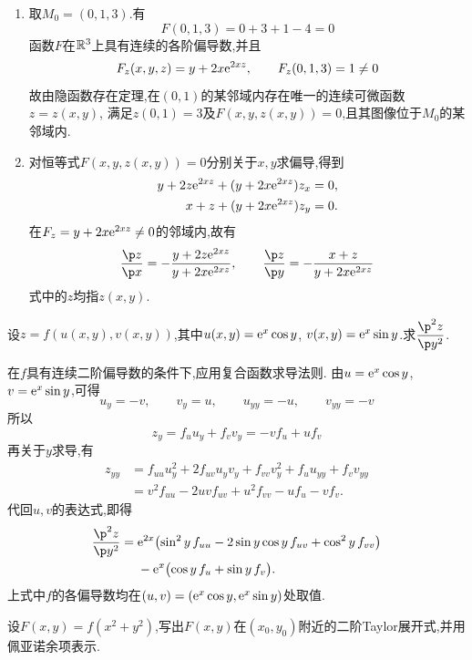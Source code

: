 \documentclass{ctexart}
\begin{document}
\begin{solution}
\begin{enumerate}[label=\tbf{(\alph*)},leftmargin=*]
\item 取$M_0=(0,1,3)$.有
\[F(0,1,3)=0+3+1-4=0\]
函数$F$在$\mathbb{R}^3$上具有连续的各阶偏导数,并且
\[F_z(x,y,z)=y+2x\mathrm{e}^{2xz},\qquad F_z(0,1,3)=1\ne0\]
故由隐函数存在定理,在$(0,1)$的某邻域内存在唯一的连续可微函数$z=z(x,y)$,
满足$z(0,1)=3$及$F(x,y,z(x,y))=0$,且其图像位于$M_0$的某邻域内.
\item 对恒等式$F(x,y,z(x,y))=0$分别关于$x,y$求偏导,得到
\[\begin{aligned}
y+2z\mathrm{e}^{2xz}+(y+2x\mathrm{e}^{2xz})z_x&=0,\\
x+z+(y+2x\mathrm{e}^{2xz})z_y&=0.
\end{aligned}\]
在$F_z=y+2x\mathrm{e}^{2xz}\ne0$的邻域内,故有
\[\dfrac{\p z}{\p x}=-\dfrac{y+2z\e^{2xz}}{y+2x\e^{2xz}},\qquad
\dfrac{\p z}{\p y}=-\dfrac{x+z}{y+2x\e^{2xz}}\]
式中的$z$均指$z(x,y)$.
\end{enumerate}
\end{solution}
\begin{problem}[6.]
设$z=f(u(x,y),v(x,y))$,其中$u(x,y)=\mathrm{e}^x\cos y$, $v(x,y)=\mathrm{e}^x\sin y$.求$\dfrac{\p^2z}{\p y^2}$.
\end{problem}
\begin{solution}
在$f$具有连续二阶偏导数的条件下,应用复合函数求导法则.
由$u=\mathrm{e}^x\cos y$, $v=\mathrm{e}^x\sin y$,可得
\[u_y=-v,\qquad v_y=u,\qquad u_{yy}=-u,\qquad v_{yy}=-v\]
所以
\[z_y=f_u u_y+f_v v_y=-vf_u+uf_v\]
再关于$y$求导,有
\[\begin{aligned}
z_{yy}
&=f_{uu}u_y^2+2f_{uv}u_yv_y+f_{vv}v_y^2+f_u u_{yy}+f_v v_{yy}\\
&=v^2f_{uu}-2uvf_{uv}+u^2f_{vv}-uf_u-vf_v.
\end{aligned}\]
代回$u,v$的表达式,即得
\[\begin{aligned}
\dfrac{\p^2z}{\p y^2}
={}&\e^{2x}\bigl(\sin^2y\,f_{uu}-2\sin y\cos y\,f_{uv}+\cos^2y\,f_{vv}\bigr)\\
&-\e^x\bigl(\cos y\,f_u+\sin y\,f_v\bigr).
\end{aligned}\]
上式中$f$的各偏导数均在$(u,v)=(\mathrm{e}^x\cos y,\mathrm{e}^x\sin y)$处取值.
\end{solution}
\begin{problem}[7.]
设$F(x,y)=f(x^2+y^2)$,写出$F(x,y)$在$(x_0,y_0)$附近的二阶Taylor展开式,并用佩亚诺余项表示.
\end{problem}
\end{document}
